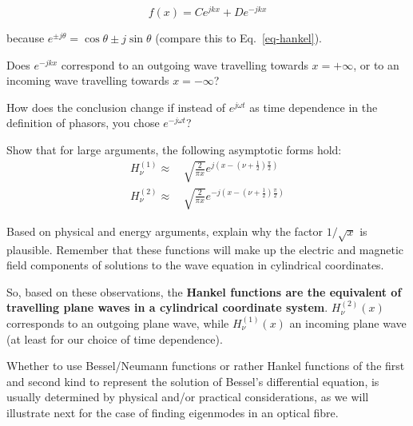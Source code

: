 \begin{equation}
f(x) = C e^{jkx} + D e^{-jkx}
\end{equation} 

because $e^{\pm j \theta} = \cos \theta \pm j \sin \theta$ (compare this to Eq.~\ref{eq-hankel}).

\pagebreak

\begin{exer}
Does $e^{-jkx}$ correspond to an outgoing wave travelling towards $x=+\infty$, or to an incoming wave travelling towards $x=-\infty$?

How does the conclusion change if instead of  $e^{j \omega t}$ as time dependence in the definition of phasors, you chose $e^{-j \omega t}$?
\end{exer}


\begin{exer}
Show that for large arguments, the following asymptotic forms hold:
\begin{align}
H_{\nu}^{(1)} \approx & \, \sqrt{\frac{2}{\pi x}} e^{j \left( x - \left(\nu + \frac{1}{2}\right)\frac{\pi}{2} \right)} \nonumber \\
  H_{\nu}^{(2)} \approx & \, \sqrt{\frac{2}{\pi x}} e^{-j \left( x - \left(\nu + \frac{1}{2}\right)\frac{\pi}{2} \right)}
\end{align}

Based on physical and energy arguments, explain why the factor $1/\sqrt{x}$ is plausible. Remember that these functions will make up the electric and magnetic field components of solutions to the wave equation in cylindrical coordinates.
                          
\end{exer}

So, based on these observations, the \textbf{Hankel functions are the equivalent of travelling plane waves in a cylindrical coordinate system}.   $H_{\nu}^{(2)}(x)$ corresponds to an outgoing plane wave, while $H_{\nu}^{(1)}(x)$ \is an incoming plane wave (at least for our choice of time dependence).

Whether to use Bessel/Neumann functions or rather Hankel functions of the first and second kind to represent the solution of Bessel's differential equation, is usually determined by physical and/or practical considerations, as we will illustrate next for the case of finding eigenmodes in an optical fibre.


\pagebreak


